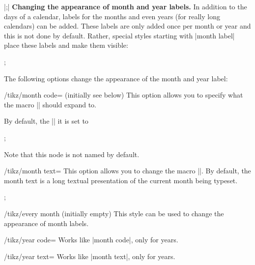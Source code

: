 \begin{command}{\calendar {}|;|}
  \medskip
  \textbf{Changing the appearance of month and year labels.}
  In addition to the days of a calendar, labels for the months and
  even years (for really long calendars) can be added. These labels
  are only added once per month or year and this is not done by
  default. Rather, special styles starting with |month label|
  place these labels and make them visible:
\begin{codeexample}[]
\tikz \calendar[dates=2000-01-01 to 2000-02-last,week list,
                month label above centered];
\end{codeexample}

  The following options change the appearance of the month and year
  label:
  \begin{key}{/tikz/month code= (initially \normalfont see below)}
    This option allows you to specify what the macro |\tikzmonthcode|
    should expand to.

    By default, the |\tikzmonthcode| it is set to
\begin{codeexample}
;
\end{codeexample}
    Note that this node is not named by default.
  \end{key}

  \begin{key}{/tikz/month text=}
    This option allows you to change the macro |\tikzmonthtext|. By
    default, the month text is a long textual presentation of the
    current month being typeset.
\begin{codeexample}
\tikz \calendar[dates=2000-01-01 to 2000-01-31,week list,
                month label above centered,
                month text=\textcolor{red}{\%mt} \%y-];
\end{codeexample}
  \end{key}

  \begin{stylekey}{/tikz/every month (initially \normalfont empty)}
    This style can be used to change the
    appearance of month labels.
  \end{stylekey}

  \begin{key}{/tikz/year code=}
    Works like |month code|, only for years.
  \end{key}

  \begin{key}{/tikz/year text=}
    Works like |month text|, only for years.
  \end{key}



\end{command}

